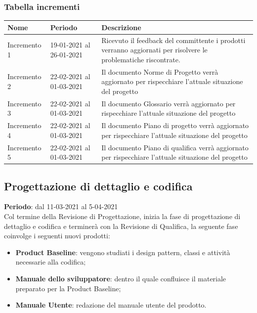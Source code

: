 	\subsubsection{Tabella incrementi}
		\begin{center}
    			\begin{tabular}{ | l | p{5cm} | p{8cm} |}
   			 \hline
    			Nome & Periodo & Descrizione \\ \hline
    			Incremento 1 & 19-01-2021 al 26-01-2021 & Ricevuto il feedback del committente i prodotti verranno aggiornati per risolvere le problematiche riscontrate. \\ \hline
    			Incremento 2 & 22-02-2021 al 01-03-2021 & Il documento Norme di Progetto verrà aggiornato per rispecchiare l'attuale situazione del progetto \\ \hline
    			Incremento 3 & 22-02-2021 al 01-03-2021 & Il documento Glossario verrà aggiornato per rispecchiare l'attuale situazione del progetto \\ \hline
			Incremento 4 & 22-02-2021 al 01-03-2021 & Il documento Piano di progetto verrà aggiornato per rispecchiare l'attuale situazione del progetto \\ \hline
			Incremento 5 & 22-02-2021 al 01-03-2021 & Il documento Piano di qualifica verrà aggiornato per rispecchiare l'attuale situazione del progetto \\ \hline
    			\end{tabular}
		\end{center}
	
	\subsection{Progettazione di dettaglio e codifica}
	\textbf{Periodo}: dal 11-03-2021 al 5-04-2021 \\
	Col termine della Revisione di Progettazione, inizia la fase di progettazione di dettaglio e codifica e terminerà con la Revisione di Qualifica, la seguente fase coinvolge i seguenti nuovi prodotti:
	\begin{itemize}
		\item \textbf{Product Baseline}: vengono studiati i design pattern, classi e attività necessarie alla codifica;
		\item \textbf{Manuale dello sviluppatore}: dentro il quale confluisce il materiale preparato per la Product Baseline;
		\item \textbf{Manuale Utente}: redazione del manuale utente del prodotto.
	\end{itemize}
	
